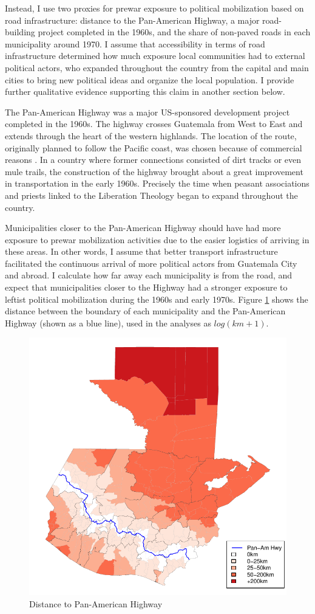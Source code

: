 \documentclass[12pt, notitlepage]{article}
\begin{document}
Instead, I use two proxies for prewar exposure to political mobilization based on road infrastructure: distance to the Pan-American Highway, a major road-building project completed in the 1960s, and the share of non-paved roads in each municipality around 1970.
I assume that accessibility in terms of road infrastructure determined how much exposure local communities had to external political actors, who expanded throughout the country from the capital and main cities to bring new political ideas and organize the local population.
I provide further qualitative evidence supporting this claim in another section below.

The Pan-American Highway was a major US-sponsored development project completed in the 1960s.
The highway crosses Guatemala from West to East and extends through the heart of the western highlands.
The location of the route, originally planned to follow the Pacific coast, was chosen because of commercial reasons \citep{Rutkow:2019aa}.
In a country where former connections consisted of dirt tracks or even mule trails, the construction of the highway brought about a great improvement in transportation in the early 1960s.
Precisely the time when peasant associations and priests linked to the Liberation Theology began to expand throughout the country.

Municipalities closer to the Pan-American Highway should have had more exposure to prewar mobilization activities due to the easier logistics of arriving in these areas.
In other words, I assume that better transport infrastructure facilitated the continuous arrival of more political actors from Guatemala City and abroad.
I calculate how far away each municipality is from the road, and expect that municipalities closer to the Highway had a stronger exposure to leftist political mobilization during the 1960s and early 1970s.
Figure \ref{fig:map_panam} shows the distance between the boundary of each municipality and the Pan-American Highway (shown as a blue line), used in the analyses as $log(km + 1)$.

\begin{figure}[htb!]
  \centering
    \includegraphics[width = .4\textwidth]{img/map_panam}

  \caption{Distance to Pan-American Highway} \label{fig:map_panam}

\end{figure}
\end{document}
